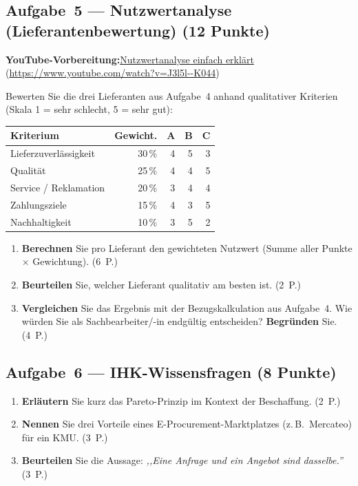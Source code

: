 \documentclass[11pt, a4paper]{article}
\begin{document}
\subsection*{Aufgabe~5 --- Nutzwertanalyse (Lieferantenbewertung) (12 Punkte)}

\noindent\textbf{\color{bfwAccent}YouTube-Vorbereitung:}\enspace \href{https://www.youtube.com/watch?v=J3l5l--K044}{Nutzwertanalyse einfach erklärt} (\url{https://www.youtube.com/watch?v=J3l5l--K044})

\medskip
Bewerten Sie die drei Lieferanten aus Aufgabe~4 anhand qualitativer Kriterien (Skala
1 = sehr schlecht, 5 = sehr gut):

\begin{center}
\begin{tabular}{lrrrr}
\toprule
\textbf{Kriterium} & \textbf{Gewicht.} & \textbf{A} & \textbf{B} & \textbf{C}\\
\midrule
Lieferzuverlässigkeit & 30\,\% & 4 & 5 & 3\\
Qualität & 25\,\% & 4 & 4 & 5\\
Service / Reklamation & 20\,\% & 3 & 4 & 4\\
Zahlungsziele & 15\,\% & 4 & 3 & 5\\
Nachhaltigkeit & 10\,\% & 3 & 5 & 2\\
\bottomrule
\end{tabular}
\end{center}

\begin{enumerate}[label=(\alph*)]
  \item \textbf{Berechnen} Sie pro Lieferant den gewichteten Nutzwert (Summe aller Punkte $\times$ Gewichtung). \hfill (6~P.)
  \item \textbf{Beurteilen} Sie, welcher Lieferant qualitativ am besten ist. \hfill (2~P.)
  \item \textbf{Vergleichen} Sie das Ergebnis mit der Bezugskalkulation aus Aufgabe~4. Wie würden Sie als Sachbearbeiter/-in endgültig entscheiden? \textbf{Begründen} Sie. \hfill (4~P.)
\end{enumerate}

\subsection*{Aufgabe~6 --- IHK-Wissensfragen (8 Punkte)}

\begin{enumerate}[label=(\alph*)]
  \item \textbf{Erläutern} Sie kurz das Pareto-Prinzip im Kontext der Beschaffung. \hfill (2~P.)
  \item \textbf{Nennen} Sie drei Vorteile eines E-Procurement-Marktplatzes (z.\,B.\ Mercateo) für ein KMU. \hfill (3~P.)
  \item \textbf{Beurteilen} Sie die Aussage: \emph{,,Eine Anfrage und ein Angebot sind dasselbe.''} \hfill (3~P.)
\end{enumerate}
\end{document}
